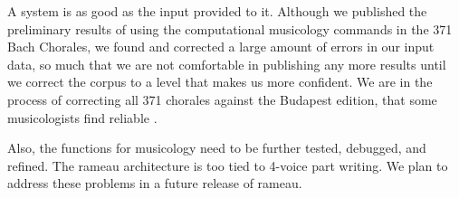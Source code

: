 A system is as good as the input provided to it. Although we published
the preliminary results of using the computational musicology commands
in the 371 Bach Chorales, we found and corrected a large amount of
errors in our input data, so much that we are not comfortable in
publishing any more results until we correct the corpus to a level
that makes us more confident. We are in the process of correcting all
371 chorales against the Budapest edition, that some musicologists
find reliable \cite{fitsioris.ea08:parallel}.

Also, the functions for musicology need to be further tested, debugged,
and refined. The rameau architecture is too tied to 4-voice part
writing. We plan to address these problems in a future release of
rameau.

